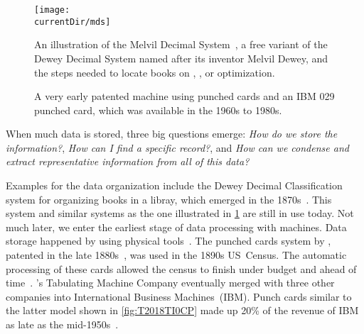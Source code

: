 \begin{figure}%
\centering%
\texttt{[image: \\currentDir/mds]}%
\caption{An illustration of the Melvil Decimal System~\cite{L2025MMDS}, a free variant of the Dewey Decimal System named after its inventor Melvil Dewey, and the steps needed to locate books on \python, \postgresql, or optimization.}%
\label{fig:mds}%
\end{figure}%
%
\begin{figure}%
\centering%
%
%
%
\floatSep%
%
%
%
\caption{A very early patented machine using punched cards and an IBM 029 punched card, which was available in the 1960s to 1980s.}%
\end{figure}%

When much data is stored, three big questions emerge:
\emph{How do we store the information?},
\emph{How can I find a specific record?},
and
\emph{How can we condense and extract representative information from all of this data?}

Examples for the data organization include the Dewey Decimal Classification system for organizing books in a libray, which emerged in the 1870s~\cite{CM2003DDCPAA,OCLC2019ITTDDC}.
This system and similar systems as the one illustrated in \cref{fig:mds} are still in use today.
Not much later, we enter the earliest stage of data processing with machines.
Data storage happened by using physical tools~\cite{H1997SATAPCS1}.
The punched cards system by \citeauthor{H1884AFCS}, patented in the late 1880s~\cite{H1884AFCS,H1892MFTS}, was used in the 1890s US~Census.
The automatic processing of these cards allowed the census to finish under budget and ahead of time~\cite{ITIPCTPORTTIAOHMOTWD}.
\citeauthor{H1884AFCS}'s Tabulating Machine Company eventually merged with three other companies into International Business Machines~(IBM).
Punch cards similar to the latter model shown in \cref{fig:T2018TI0CP} made up 20\% of the revenue of IBM as late as the mid\nobreakdashes-1950s~\cite{ITIPCTPORTTIAOHMOTWD}.


